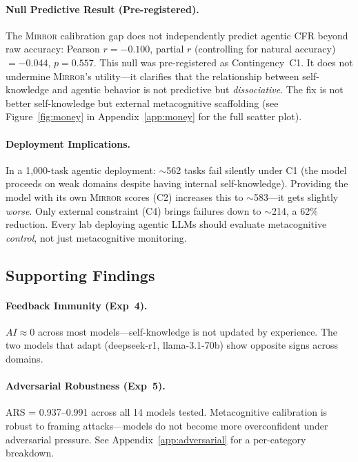 \documentclass[10pt]{article}
\newcommand{\mirror}{\textsc{Mirror}}
\newcommand{\ARS}{ARS}
\newcommand{\CFR}{CFR}
\newcommand{\AI}{AI}
\begin{document}
\paragraph{Null Predictive Result (Pre-registered).}
The \mirror{} calibration gap does not independently predict agentic \CFR{} beyond
raw accuracy: Pearson $r = -0.100$, partial $r$ (controlling for natural accuracy)
$= -0.044$, $p = 0.557$. This null was pre-registered as Contingency~C1. It does
not undermine \mirror{}'s utility---it clarifies that the relationship between
self-knowledge and agentic behavior is not predictive but \textit{dissociative}.
The fix is not better self-knowledge but external metacognitive scaffolding
(see Figure~\ref{fig:money} in Appendix~\ref{app:money} for the full scatter plot).

\paragraph{Deployment Implications.}
In a 1,000-task agentic deployment: ${\sim}$562 tasks fail silently under C1 (the
model proceeds on weak domains despite having internal self-knowledge). Providing
the model with its own \mirror{} scores (C2) increases this to ${\sim}$583---it
gets slightly \textit{worse}. Only external constraint (C4) brings failures down to
${\sim}$214, a 62\% reduction. Every lab deploying agentic LLMs should evaluate
metacognitive \textit{control}, not just metacognitive monitoring.

\subsection{Supporting Findings}

\paragraph{Feedback Immunity (Exp~4).}
$\AI{} \approx 0$ across most models---self-knowledge is not updated by experience. The two models that adapt (deepseek-r1, llama-3.1-70b) show opposite signs across domains.

\paragraph{Adversarial Robustness (Exp~5).}
\ARS{} = 0.937--0.991 across all 14 models tested. Metacognitive calibration is
robust to framing attacks---models do not become more overconfident under
adversarial pressure. See Appendix~\ref{app:adversarial} for a per-category breakdown.
\end{document}
